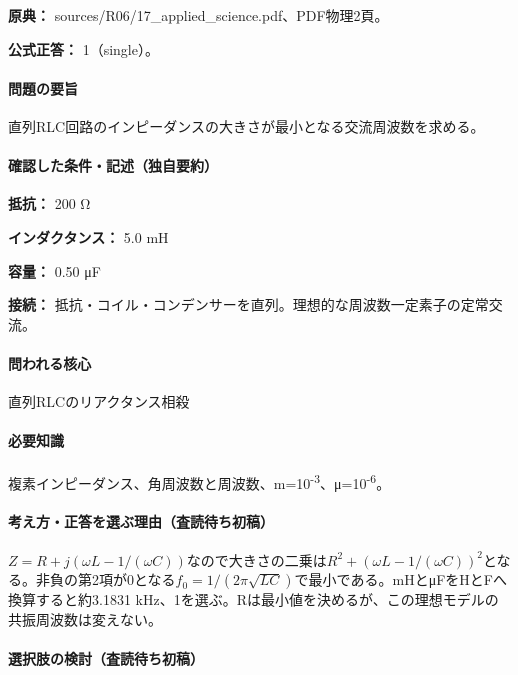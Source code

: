 \noindent\textbf{原典：} sources/R06/17\_applied\_science.pdf、PDF物理2頁。

\textbf{公式正答：} 1（single）。

\paragraph{問題の要旨} 直列RLC回路のインピーダンスの大きさが最小となる交流周波数を求める。

\paragraph{確認した条件・記述（独自要約）}\mbox{}\par

\noindent\textbf{抵抗：} 200 Ω\par

\noindent\textbf{インダクタンス：} 5.0 mH\par

\noindent\textbf{容量：} 0.50 μF\par

\noindent\textbf{接続：} 抵抗・コイル・コンデンサーを直列。理想的な周波数一定素子の定常交流。\par

\paragraph{問われる核心} 直列RLCのリアクタンス相殺

\paragraph{必要知識} 複素インピーダンス、角周波数と周波数、m=\allowbreak{}10\textsuperscript{-3}、μ=10\textsuperscript{-6}。

\paragraph{考え方・正答を選ぶ理由（査読待ち初稿）} \(Z=R+j(\omega L-1/(\omega C))\)なので大きさの二乗は\(R^2+(\omega L-1/(\omega C))^2\)となる。非負の第2項が0となる\(f_0=1/(2\pi\sqrt{LC})\)で最小である。mHとμFをHとFへ換算すると約3.1831 kHz、1を選ぶ。Rは最小値を決めるが、この理想モデルの共振周波数は変えない。

\paragraph{選択肢の検討（査読待ち初稿）}\mbox{}\par

